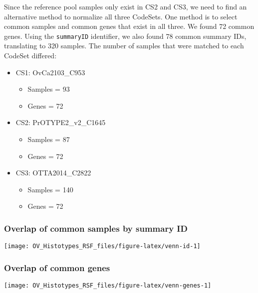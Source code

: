 \documentclass[
]{report}
\providecommand{\tightlist}{%
  \setlength{\itemsep}{0pt}\setlength{\parskip}{0pt}}
\begin{document}
Since the reference pool samples only exist in CS2 and CS3, we need to find an alternative method to normalize all three CodeSets. One method is to select common samples and common genes that exist in all three. We found 72 common genes. Using the \texttt{summaryID} identifier, we also found 78 common summary IDs, translating to 320 samples. The number of samples that were matched to each CodeSet differed:

\begin{itemize}
\item
  CS1: OvCa2103\_C953

  \begin{itemize}
  \tightlist
  \item
    Samples = 93
  \item
    Genes = 72
  \end{itemize}
\item
  CS2: PrOTYPE2\_v2\_C1645

  \begin{itemize}
  \tightlist
  \item
    Samples = 87
  \item
    Genes = 72
  \end{itemize}
\item
  CS3: OTTA2014\_C2822

  \begin{itemize}
  \tightlist
  \item
    Samples = 140
  \item
    Genes = 72
  \end{itemize}
\end{itemize}

\hypertarget{overlap-of-common-samples-by-summary-id}{%
\subsubsection{Overlap of common samples by summary ID}\label{overlap-of-common-samples-by-summary-id}}

\begin{center}\texttt{[image: OV\_Histotypes\_RSF\_files/figure-latex/venn-id-1]} \end{center}

\hypertarget{overlap-of-common-genes}{%
\subsubsection{Overlap of common genes}\label{overlap-of-common-genes}}

\begin{center}\texttt{[image: OV\_Histotypes\_RSF\_files/figure-latex/venn-genes-1]} \end{center}
\end{document}
